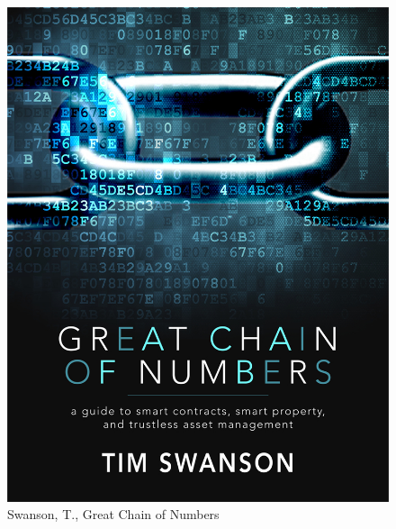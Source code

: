 \documentclass{beamer}
\begin{document}
\begin{frame}
    \begin{figure}
        \includegraphics[height=0.9\textheight]{tim_obl}
        \caption{Swanson, T., Great Chain of Numbers}
    \end{figure}
\end{frame}

\end{document}
